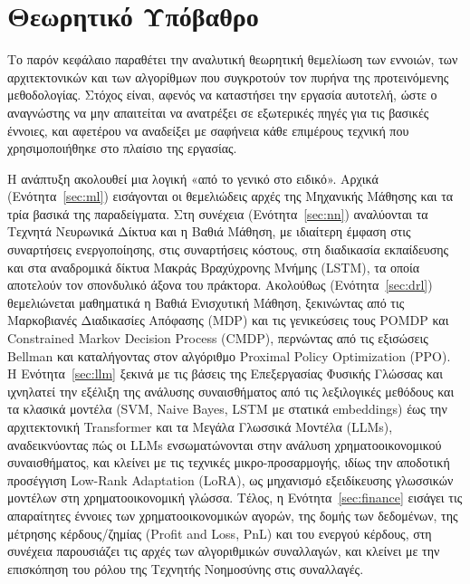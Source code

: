 

\chapter{Θεωρητικό Υπόβαθρο}
\label{ch:theory}

Το παρόν κεφάλαιο παραθέτει την αναλυτική θεωρητική θεμελίωση των εννοιών, των
αρχιτεκτονικών και των αλγορίθμων που συγκροτούν τον πυρήνα της προτεινόμενης
μεθοδολογίας. Στόχος είναι, αφενός να καταστήσει την εργασία
αυτοτελή, ώστε ο αναγνώστης να μην απαιτείται να ανατρέξει σε εξωτερικές πηγές
για τις βασικές έννοιες, και αφετέρου να αναδείξει με σαφήνεια
κάθε επιμέρους τεχνική που χρησιμοποιήθηκε στο πλαίσιο της εργασίας.

Η ανάπτυξη ακολουθεί μια λογική «από το γενικό στο ειδικό». Αρχικά
(Ενότητα~\ref{sec:ml}) εισάγονται οι θεμελιώδεις αρχές της Μηχανικής Μάθησης
και τα τρία βασικά της παραδείγματα. Στη συνέχεια (Ενότητα~\ref{sec:nn})
αναλύονται τα Τεχνητά Νευρωνικά Δίκτυα και η Βαθιά Μάθηση, με ιδιαίτερη έμφαση
στις συναρτήσεις ενεργοποίησης, στις συναρτήσεις κόστους, στη διαδικασία
εκπαίδευσης και στα αναδρομικά δίκτυα Μακράς Βραχύχρονης Μνήμης (LSTM), τα
οποία αποτελούν τον σπονδυλικό άξονα του πράκτορα. Ακολούθως
(Ενότητα~\ref{sec:drl}) θεμελιώνεται μαθηματικά η Βαθιά Ενισχυτική Μάθηση,
ξεκινώντας από τις Μαρκοβιανές Διαδικασίες Απόφασης (MDP) και τις γενικεύσεις τους
POMDP και Constrained Markov Decision Process (CMDP), περνώντας από τις εξισώσεις Bellman και καταλήγοντας στον
αλγόριθμο Proximal Policy Optimization (PPO). Η Ενότητα~\ref{sec:llm}
ξεκινά με τις βάσεις της Επεξεργασίας Φυσικής Γλώσσας και ιχνηλατεί την
εξέλιξη της ανάλυσης συναισθήματος από τις λεξιλογικές μεθόδους και τα
κλασικά μοντέλα (SVM, Naive Bayes, LSTM με στατικά embeddings) έως
την αρχιτεκτονική Transformer και τα Μεγάλα Γλωσσικά Μοντέλα (LLMs),
αναδεικνύοντας πώς οι LLMs ενσωματώνονται στην ανάλυση χρηματοοικονομικού
συναισθήματος, και κλείνει με τις τεχνικές μικρο-προσαρμογής, ιδίως την
αποδοτική προσέγγιση Low-Rank Adaptation (LoRA), ως μηχανισμό εξειδίκευσης
γλωσσικών μοντέλων στη χρηματοοικονομική γλώσσα.
Τέλος, η Ενότητα~\ref{sec:finance} εισάγει τις απαραίτητες έννοιες των
χρηματοοικονομικών αγορών, της δομής των δεδομένων, της μέτρησης κέρδους/ζημίας
(Profit and Loss, PnL) και του ενεργού κέρδους, στη συνέχεια παρουσιάζει
τις αρχές των αλγοριθμικών συναλλαγών, και κλείνει με την επισκόπηση
του ρόλου της Τεχνητής Νοημοσύνης στις συναλλαγές.


